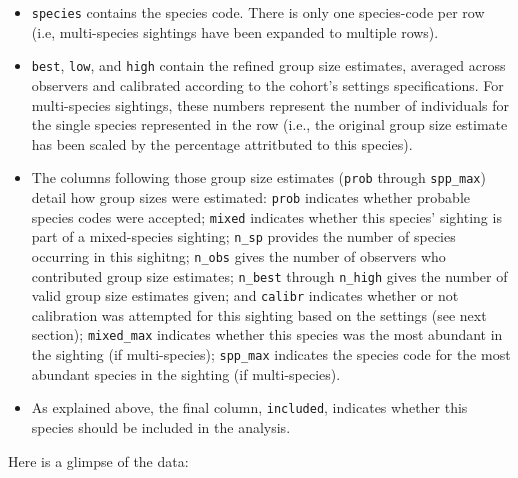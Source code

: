 \documentclass[
]{book}
\begin{document}
\begin{itemize}
\item
  \texttt{species} contains the species code. There is only one species-code per row (i.e, multi-species sightings have been expanded to multiple rows).
\item
  \texttt{best}, \texttt{low}, and \texttt{high} contain the refined group size estimates, averaged across observers and calibrated according to the cohort's settings specifications. For multi-species sightings, these numbers represent the number of individuals for the single species represented in the row (i.e., the original group size estimate has been scaled by the percentage attritbuted to this species).
\item
  The columns following those group size estimates (\texttt{prob} through \texttt{spp\_max}) detail how group sizes were estimated: \texttt{prob} indicates whether probable species codes were accepted; \texttt{mixed} indicates whether this species' sighting is part of a mixed-species sighting; \texttt{n\_sp} provides the number of species occurring in this sighitng; \texttt{n\_obs} gives the number of observers who contributed group size estimates; \texttt{n\_best} through \texttt{n\_high} gives the number of valid group size estimates given; and \texttt{calibr} indicates whether or not calibration was attempted for this sighting based on the settings (see next section); \texttt{mixed\_max} indicates whether this species was the most abundant in the sighting (if multi-species); \texttt{spp\_max} indicates the species code for the most abundant species in the sighting (if multi-species).
\item
  As explained above, the final column, \texttt{included}, indicates whether this species should be included in the analysis.
\end{itemize}

Here is a glimpse of the data:
\end{document}
